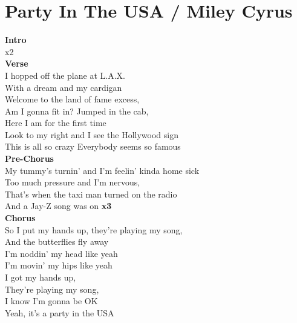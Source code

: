 \section{Party In The USA / Miley Cyrus}\label{sec:partyintheusa}

\Cmajor
\Eminor
\Aminor
\Gmajor
\Dminor
\Fmajor


\textbf{Intro} \\
     x2\\
\textbf{Verse}\\
I hopped off the plane at L.A.X.\\
With a dream and my cardigan\\
Welcome to the land of fame excess,\\
Am I gonna fit in? Jumped in the cab,\\
Here I am for the first time\\
Look to my right and I see the Hollywood sign\\
This is all so crazy Everybody seems so famous\\
\textbf{Pre-Chorus}\\
My tummy's turnin' and I'm feelin' kinda home sick\\
Too much pressure and I'm nervous,\\
That's when the taxi man turned on the radio\\
And a Jay-Z song was on  \textbf{x3}\\
\textbf{Chorus}\\
So I put my hands up, they're playing my song,\\
And the butterflies fly away\\
I'm noddin' my head like yeah\\
I'm movin' my hips like yeah\\
I got my hands up,\\
They're playing my song,\\
I know I'm gonna be OK\\
Yeah, it's a party in the USA\\
